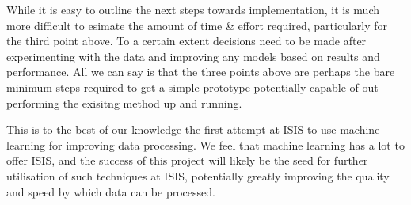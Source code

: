 \documentclass[paper=a4, fontsize=8pt]{scrartcl} \usepackage[T1]{fontenc}
\begin{document}
While it is easy to outline the next steps towards implementation, it is much more 
difficult to esimate the amount of time \& effort required, particularly for the 
third point above. To a certain extent decisions need to be made after experimenting
with the data and improving any models based on results and performance. All we can say
is that the three points above are perhaps the bare minimum steps required to get a simple
prototype potentially capable of out performing the exisitng method up and running.

This is to the best of our knowledge the first attempt at ISIS to use machine 
learning for improving data processing. We feel that machine learning has a lot to offer ISIS, 
and the success of this project will likely be the seed for further utilisation of such
techniques at ISIS, potentially greatly improving the quality and speed by which data
can be processed.


 
\end{document}

